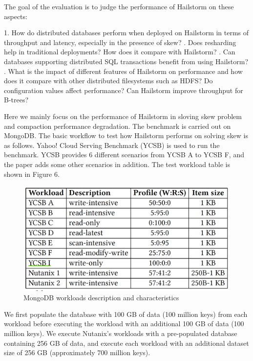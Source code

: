 \documentclass[a4paper,10pt,twoside]{article}
\begin{document}
The goal of the evaluation is to judge the performance of Hailstorm on these aspects:
\begin{displayquote}
1. How do distributed databases perform when deployed
on Hailstorm in terms of throughput and latency, especially
in the presence of skew? 
. Does resharding help in traditional deployments? How
does it compare with Hailstorm?
. Can databases supporting distributed SQL transactions
benefit from using Hailstorm? 
. What is the impact of different features of Hailstorm
on performance and how does it compare with other
distributed filesystems such as HDFS? Do configuration
values affect performance? Can Hailstorm
improve throughput for B-trees?
\end{displayquote}
Here we mainly focus on the performance of Hailstorm in sloving skew problem and compaction performance degradation.
The benchmark is carried out on MongoDB.
The basic workflow to test how Hailstorm performs on solving skew is as follows.
Yahoo! Cloud Serving Benchmark (YCSB) is used to run the benchmark.
YCSB provides 6 different scenarios from YCSB A to YCSB F, and the paper adds some other scenarios in addition.
The test workload table is shown in Figure 6.
\begin{figure}[h]
    \centering
	\includegraphics[scale=0.3]{YCSB_workload.png}
    \caption{MongoDB workloads description and characteristics}
    \label{fig:mesh1}
\end{figure}
\begin{displayquote}
	We first populate the database with 100 GB of data (100
	million keys) from each workload before executing the workload
	with an additional 100 GB of data (100 million keys).
	We execute Nutanix’s workloads with a pre-populated database
	containing 256 GB of data, and execute each workload
	with an additional dataset size of 256 GB (approximately 700
	million keys).
\end{displayquote}
\end{document}
